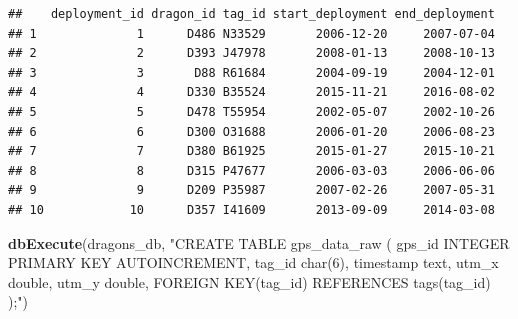 \documentclass[
]{book}
\newenvironment{Shaded}{\begin{snugshade}}{\end{snugshade}}
\newcommand{\AttributeTok}[1]{\textcolor[rgb]{0.13,0.29,0.53}{#1}}
\newcommand{\ConstantTok}[1]{\textcolor[rgb]{0.56,0.35,0.01}{#1}}
\newcommand{\DecValTok}[1]{\textcolor[rgb]{0.00,0.00,0.81}{#1}}
\newcommand{\FunctionTok}[1]{\textcolor[rgb]{0.13,0.29,0.53}{\textbf{#1}}}
\newcommand{\NormalTok}[1]{#1}
\newcommand{\OtherTok}[1]{\textcolor[rgb]{0.56,0.35,0.01}{#1}}
\newcommand{\SpecialCharTok}[1]{\textcolor[rgb]{0.81,0.36,0.00}{\textbf{#1}}}
\newcommand{\StringTok}[1]{\textcolor[rgb]{0.31,0.60,0.02}{#1}}
\begin{document}
\begin{verbatim}
##    deployment_id dragon_id tag_id start_deployment end_deployment
## 1              1      D486 N33529       2006-12-20     2007-07-04
## 2              2      D393 J47978       2008-01-13     2008-10-13
## 3              3       D88 R61684       2004-09-19     2004-12-01
## 4              4      D330 B35524       2015-11-21     2016-08-02
## 5              5      D478 T55954       2002-05-07     2002-10-26
## 6              6      D300 O31688       2006-01-20     2006-08-23
## 7              7      D380 B61925       2015-01-27     2015-10-21
## 8              8      D315 P47677       2006-03-03     2006-06-06
## 9              9      D209 P35987       2007-02-26     2007-05-31
## 10            10      D357 I41609       2013-09-09     2014-03-08
\end{verbatim}

\begin{Shaded}
\begin{Highlighting}[]
\FunctionTok{dbExecute}\NormalTok{(dragons\_db, }\StringTok{"CREATE TABLE gps\_data\_raw (}
\StringTok{gps\_id INTEGER PRIMARY KEY AUTOINCREMENT,}
\StringTok{tag\_id char(6),}
\StringTok{timestamp text, }
\StringTok{utm\_x double,}
\StringTok{utm\_y double,}
\StringTok{FOREIGN KEY(tag\_id) REFERENCES tags(tag\_id)}
\StringTok{);"}\NormalTok{)}
\end{Highlighting}
\end{Shaded}

\begin{Shaded}
\end{Shaded}
\end{document}
